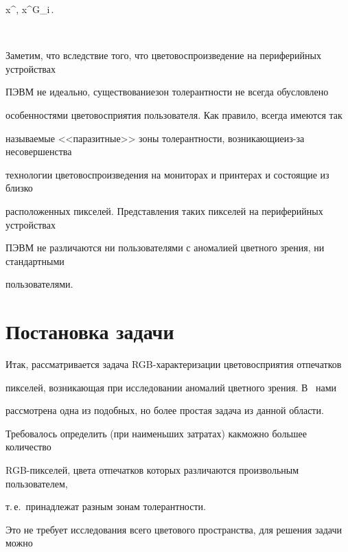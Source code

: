 \enskip x^\prime, x^{\prime\prime}\in G_i\,.


$$





Заметим, что вследствие того, что цветовоспроизведение на периферийных устройствах


ПЭВМ не идеально, существование\linebreak зон толерантности не всегда обусловлено


особенностями цветовосприятия пользователя. Как правило, всегда имеются так


называемые <<паразитные>> зоны толерантности, возникающие\linebreak из-за несовершенства


технологии цветовоспроизведения на мониторах и принтерах и состоящие из близко


расположенных пикселей. Представления таких пикселей на периферийных устройствах


ПЭВМ не различаются ни пользователями с аномалией цветного зрения, ни стандартными


пользователями.





\section{Постановка задачи }





Итак, рассматривается задача RGB-характеризации цветовосприятия отпечатков


пикселей, возникающая при исследовании аномалий цветного зрения. В~\cite{4-6} нами


рассмотрена одна из подобных, но более простая  задача из данной области.





Требовалось определить (при наименьших затратах) как\linebreak можно большее количество


RGB-пик\-се\-лей, цвета отпечатков которых различаются произвольным пользователем,


т.\,е.\ принадлежат раз\-ным зонам толерантности.





Это не требует исследования всего цветового пространства, для решения задачи можно


